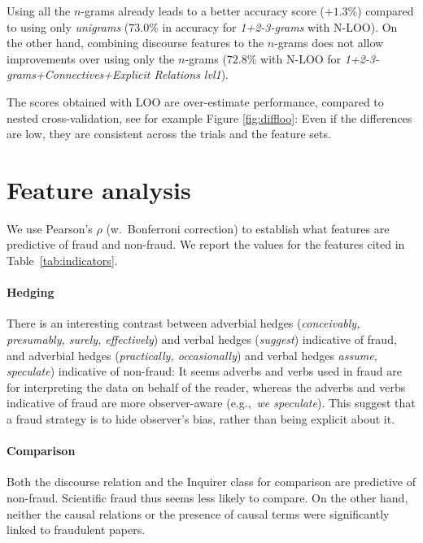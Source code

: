 \documentclass[11pt,letterpaper]{article}
\begin{document}
Using all the $n$-grams already leads to a better accuracy score ($+1.3$\%) compared to using only \textit{unigrams} ($73.0$\% in accuracy for \textit{1+2-3-grams} with N-LOO).
On the other hand, combining discourse features to the $n$-grams does not allow improvements over using only the $n$-grams ($72.8$\% with N-LOO for \textit{1+2-3-grams+Connectives+Explicit Relations lvl1}).


The scores obtained with LOO are over-estimate performance, compared to  nested cross-validation, see for example Figure \ref{fig:diffloo}: Even if the differences are low, they are consistent across the trials and the feature sets.




\section{Feature analysis}


We use Pearson's $\rho$ (w.~Bonferroni correction) to establish what features are predictive of fraud and non-fraud.
We report the values for the features cited in Table~\ref{tab:indicators}.


\paragraph{Hedging} There is an interesting contrast between adverbial hedges ({\em conceivably, presumably, surely, effectively}) and verbal hedges ({\em suggest}) indicative of fraud, and adverbial hedges ({\em practically, occasionally}) and verbal hedges {\em assume, speculate}) indicative of non-fraud: It seems adverbs and verbs used in fraud are for interpreting the data on behalf of the reader, whereas the adverbs and verbs indicative of fraud are more observer-aware (e.g.,~{\em we speculate}). This suggest that a fraud strategy is to hide observer’s bias, rather than being explicit about it. 


\paragraph{Comparison} Both the discourse relation and the Inquirer class for comparison are predictive of non-fraud. Scientific fraud thus seems less likely to compare.
On the other hand, neither  the causal relations or the presence of causal terms were significantly linked to fraudulent papers.
\end{document}
